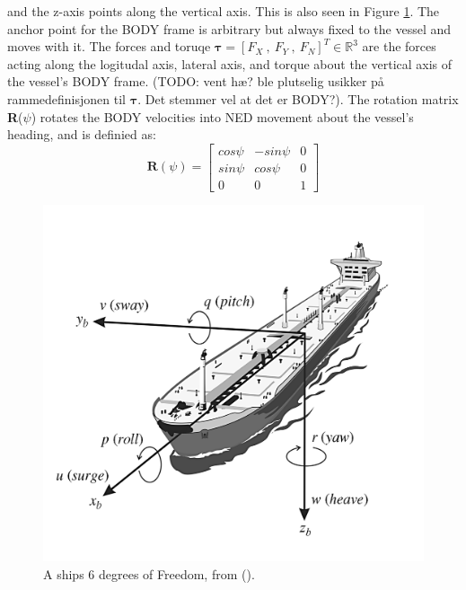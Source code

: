 and the z-axis points along the vertical axis. This is also seen in Figure \ref{FIG: Ship DOF}.
The anchor point for the BODY frame is arbitrary but always fixed to the vessel and moves with it. 
The forces and toruqe $\bm{\tau} = [F_{X}\ , \ F_{Y} \ , \ F_{N}]^T \in \mathbb{R}^{3}$ are the forces acting along
the logitudal axis, lateral axis, and torque about the vertical axis of the vessel's BODY frame. (TODO: vent hæ? ble plutselig usikker på rammedefinisjonen
til $\bm{\tau}$. Det stemmer vel at det er BODY?). The rotation matrix \textbf{R}($\psi$) rotates the BODY velocities into \gls{NED} movement about the
vessel's heading, and is definied as:
\begin{equation}
    \textbf{R}(\psi) = \begin{bmatrix}
                        cos\psi &   -sin\psi & 0\\[-5pt]
                        sin\psi & cos\psi    & 0\\[-5pt]
                        0       &   0        & 1
                        \end{bmatrix}
\end{equation}


\begin{figure}[ht]
    \centering
    \includegraphics[height=0.35\textheight]{Images/SHIPDOF_FOSSEN.png}
    \caption{A ships 6 degrees of Freedom, from (\cite{fossen2011handbook}).} %
    \label{FIG: Ship DOF}
\end{figure}


